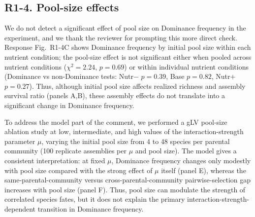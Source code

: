 \subsection*{R1-4. Pool-size effects}


\responselabel
We do not detect a significant effect of pool size on Dominance frequency in the experiment, and we thank the reviewer for prompting this more direct check. Response Fig.~R1-4C shows Dominance frequency by initial pool size within each nutrient condition; the pool-size effect is not significant either when pooled across nutrient conditions ($\chi^2 = 2.24$, $p = 0.69$) or within individual nutrient conditions (Dominance vs non-Dominance tests: Nutr$-$ $p = 0.39$, Base $p = 0.82$, Nutr$+$ $p = 0.27$). Thus, although initial pool size affects realized richness and assembly survival ratio (panels A,B), these assembly effects do not translate into a significant change in Dominance frequency.


To address the model part of the comment, we performed a gLV pool-size ablation study at low, intermediate, and high values of the interaction-strength parameter $\mu$, varying the initial pool size from 4 to 48 species per parental community (100 replicate assemblies per $\mu$ and pool size). The model gives a consistent interpretation: at fixed $\mu$, Dominance frequency changes only modestly with pool size compared with the strong effect of $\mu$ itself (panel E), whereas the same-parental-community versus cross-parental-community pairwise-selection gap increases with pool size (panel F). Thus, pool size can modulate the strength of correlated species fates, but it does not explain the primary interaction-strength-dependent transition in Dominance frequency.

